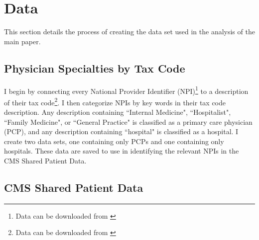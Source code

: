 \documentclass[11pt]{article}
\begin{document}
\clearpage

\renewcommand*{\bibfont}{\footnotesize}

\printbibliography

\clearpage


\appendix

\section{Data}\label{app:data}

This section details the process of creating the data set used in the analysis of the main paper. 

\subsection{Physician Specialties by Tax Code}\label{sec:taxcode}

I begin by connecting every National Provider Identifier (NPI)\footnote{Data can be downloaded from \hyperlink{https://download.cms.gov/nppes/NPI/Files.html}{}} to a description of their tax code\footnote{Data can be downloaded from \hyperlink{https://nucc.org/index.php/code-sets-mainmenu-41/provider-taxonomy-mainmenu-40/pdf-mainmenu-53}{}}. I then categorize NPIs by key words in their tax code description. Any description containing ``Internal Medicine", ``Hospitalist", ``Family Medicine", or ``General Practice" is classified as a primary care physician (PCP), and any description containing ``hospital" is classified as a hospital. I create two data sets, one containing only PCPs and one containing only hospitals. These data are saved to use in identifying the relevant NPIs in the CMS Shared Patient Data. 



\subsection{CMS Shared Patient Data}\label{sec:sharedpat}
\end{document}
